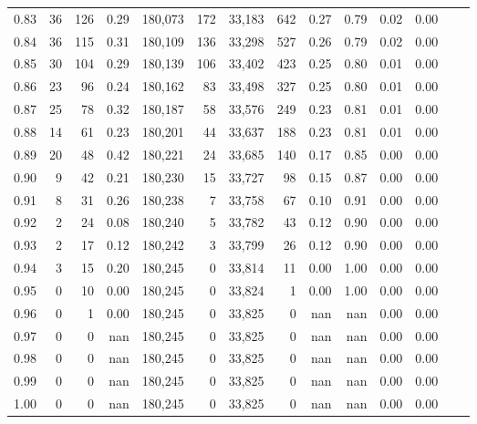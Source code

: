 \begin{tabular}{rrrrrrrrrrrrrr}
0.83 &      36 &  126 &    0.29 &  180,073 &      172 &  33,183 &     642 &  0.27 &  0.79 &  0.02 &      0.00 \\
0.84 &      36 &  115 &    0.31 &  180,109 &      136 &  33,298 &     527 &  0.26 &  0.79 &  0.02 &      0.00 \\
0.85 &      30 &  104 &    0.29 &  180,139 &      106 &  33,402 &     423 &  0.25 &  0.80 &  0.01 &      0.00 \\
0.86 &      23 &   96 &    0.24 &  180,162 &       83 &  33,498 &     327 &  0.25 &  0.80 &  0.01 &      0.00 \\
0.87 &      25 &   78 &    0.32 &  180,187 &       58 &  33,576 &     249 &  0.23 &  0.81 &  0.01 &      0.00 \\
0.88 &      14 &   61 &    0.23 &  180,201 &       44 &  33,637 &     188 &  0.23 &  0.81 &  0.01 &      0.00 \\
0.89 &      20 &   48 &    0.42 &  180,221 &       24 &  33,685 &     140 &  0.17 &  0.85 &  0.00 &      0.00 \\
0.90 &       9 &   42 &    0.21 &  180,230 &       15 &  33,727 &      98 &  0.15 &  0.87 &  0.00 &      0.00 \\
0.91 &       8 &   31 &    0.26 &  180,238 &        7 &  33,758 &      67 &  0.10 &  0.91 &  0.00 &      0.00 \\
0.92 &       2 &   24 &    0.08 &  180,240 &        5 &  33,782 &      43 &  0.12 &  0.90 &  0.00 &      0.00 \\
0.93 &       2 &   17 &    0.12 &  180,242 &        3 &  33,799 &      26 &  0.12 &  0.90 &  0.00 &      0.00 \\
0.94 &       3 &   15 &    0.20 &  180,245 &        0 &  33,814 &      11 &  0.00 &  1.00 &  0.00 &      0.00 \\
0.95 &       0 &   10 &    0.00 &  180,245 &        0 &  33,824 &       1 &  0.00 &  1.00 &  0.00 &      0.00 \\
0.96 &       0 &    1 &    0.00 &  180,245 &        0 &  33,825 &       0 &   nan &   nan &  0.00 &      0.00 \\
0.97 &       0 &    0 &     nan &  180,245 &        0 &  33,825 &       0 &   nan &   nan &  0.00 &      0.00 \\
0.98 &       0 &    0 &     nan &  180,245 &        0 &  33,825 &       0 &   nan &   nan &  0.00 &      0.00 \\
0.99 &       0 &    0 &     nan &  180,245 &        0 &  33,825 &       0 &   nan &   nan &  0.00 &      0.00 \\
1.00 &       0 &    0 &     nan &  180,245 &        0 &  33,825 &       0 &   nan &   nan &  0.00 &      0.00 \\
\bottomrule
\end{tabular}

